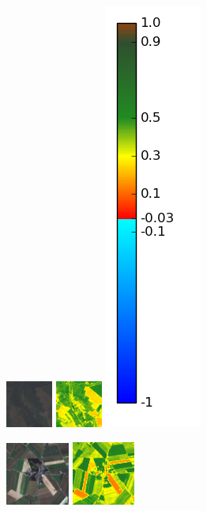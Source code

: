\documentclass{book}
\begin{document}
\begin{figure}[H]
\centerline{
\includegraphics[scale=1.5]{../3_ndvi/images/Brignancourt/07_rgb.png}
\includegraphics[scale=1.5]{../3_ndvi/images/Brignancourt/07_ndvi.png}
\includegraphics[scale=0.3]{../3_ndvi/images/colormap.png}
}
\centerline{
\includegraphics[scale=1.5]{../3_ndvi/images/Omiecourt/07_rgb.png}
\includegraphics[scale=1.5]{../3_ndvi/images/Omiecourt/07_ndvi.png}
}
\end{figure}
\end{document}
